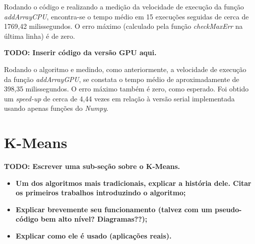 \documentclass[12pt,
openright, 
oneside, %
a4paper,    %
brazil]{facom-ufu-abntex2}
\begin{document}
Rodando o código e realizando a medição da velocidade de execução da função \textit{addArrayCPU}, encontra-se o tempo médio em 15 execuções seguidas de cerca de 1769,42 milissegundos. O erro máximo (calculado pela função \textit{checkMaxErr} na última linha) é de zero.

\textbf{TODO: Inserir código da versão GPU aqui.}

Rodando o algoritmo e medindo, como anteriormente, a velocidade de execução da função \textit{addArrayGPU}, se constata o tempo médio de aproximadamente de 398,35 milissegundos. O erro máximo também é zero, como esperado. Foi obtido um \textit{speed-up} de cerca de 4,44 vezes em relação à versão serial implementada usando apenas funções do \textit{Numpy}.

% 





\section{K-Means}
\label{sec:kmeans}


\textbf{TODO: Escrever uma sub-seção sobre o K-Means.}

\begin{itemize}
  \item \textbf{Um dos algoritmos mais tradicionais, explicar a história dele. Citar os primeiros trabalhos introduzindo o algoritmo;}
  \item \textbf{Explicar brevemente seu funcionamento (talvez com um pseudo-código bem alto nível? Diagramas??);}
  \item \textbf{Explicar como ele é usado (aplicações reais).}
\end{itemize}




\end{document}
